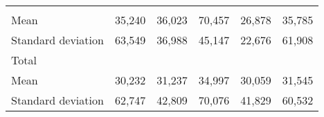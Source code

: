 \begin{tabular}{llllll}
  \multicolumn{1}{|r}{} &
  \multicolumn{1}{r}{} &
  \multicolumn{1}{r}{} &
  \multicolumn{1}{r}{} &
  \multicolumn{1}{r}{} \\
\multicolumn{1}{l}{\hspace{4em}Mean} &
  \multicolumn{1}{|r}{35,240} &
  \multicolumn{1}{r}{36,023} &
  \multicolumn{1}{r}{70,457} &
  \multicolumn{1}{r}{26,878} &
  \multicolumn{1}{r}{35,785} \\
\multicolumn{1}{l}{\hspace{4em}Standard deviation} &
  \multicolumn{1}{|r}{63,549} &
  \multicolumn{1}{r}{36,988} &
  \multicolumn{1}{r}{45,147} &
  \multicolumn{1}{r}{22,676} &
  \multicolumn{1}{r}{61,908} \\
\multicolumn{1}{l}{\hspace{3em}Total} &
  \multicolumn{1}{|r}{} &
  \multicolumn{1}{r}{} &
  \multicolumn{1}{r}{} &
  \multicolumn{1}{r}{} &
  \multicolumn{1}{r}{} \\
\multicolumn{1}{l}{\hspace{4em}Mean} &
  \multicolumn{1}{|r}{30,232} &
  \multicolumn{1}{r}{31,237} &
  \multicolumn{1}{r}{34,997} &
  \multicolumn{1}{r}{30,059} &
  \multicolumn{1}{r}{31,545} \\
\multicolumn{1}{l}{\hspace{4em}Standard deviation} &
  \multicolumn{1}{|r}{62,747} &
  \multicolumn{1}{r}{42,809} &
  \multicolumn{1}{r}{70,076} &
  \multicolumn{1}{r}{41,829} &
  \multicolumn{1}{r}{60,532} \\
\cline{1-6}
\end{tabular}


